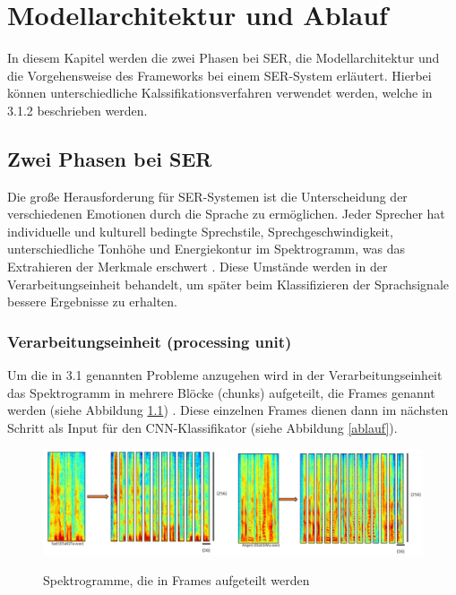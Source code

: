 \chapter{Modellarchitektur und Ablauf}

In diesem Kapitel werden die zwei Phasen bei SER, die Modellarchitektur und die Vorgehensweise des Frameworks bei einem SER-System erläutert. Hierbei können unterschiedliche Kalssifikationsverfahren verwendet werden, welche in 3.1.2 beschrieben werden.

\section{Zwei Phasen bei SER}

Die große Herausforderung für SER-Systemen ist die Unterscheidung der verschiedenen Emotionen durch die Sprache zu ermöglichen. Jeder Sprecher hat individuelle und kulturell bedingte Sprechstile, Sprechgeschwindigkeit, unterschiedliche Tonhöhe und Energiekontur im Spektrogramm, was das Extrahieren der Merkmale erschwert \cite{badshah2019deep}. Diese Umstände werden in der Verarbeitungseinheit behandelt, um später beim Klassifizieren der Sprachsignale bessere  Ergebnisse zu erhalten. 
\subsection{Verarbeitungseinheit (processing unit)}
Um die in 3.1 genannten Probleme anzugehen wird in der Verarbeitungseinheit das Spektrogramm in mehrere Blöcke (chunks) aufgeteilt, die Frames genannt werden (siehe Abbildung \ref{frames}) \cite{badshah2019deep}. Diese einzelnen Frames dienen dann im nächsten Schritt als Input für den CNN-Klassifikator (siehe Abbildung \ref{ablauf}).
\begin{figure}
	\centering
	\includegraphics[width=1\textwidth]{images/frames}
	\caption{\label{frames}}Spektrogramme, die in Frames aufgeteilt werden \cite{badshah2019deep}
\end{figure}
